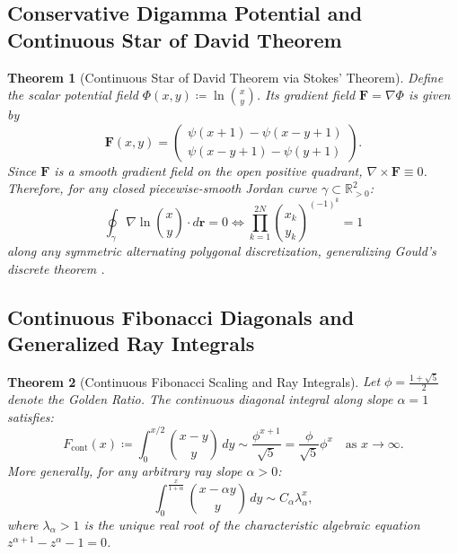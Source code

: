\documentclass[11pt,a4paper]{article}
\theoremstyle{plain}
\newtheorem{theorem}{Theorem}[section]
\theoremstyle{definition}
\theoremstyle{remark}
\numberwithin{equation}{section}
\begin{document}
\subsection{Conservative Digamma Potential and Continuous Star of David Theorem}

\begin{theorem}[Continuous Star of David Theorem via Stokes' Theorem]
Define the scalar potential field $\Phi(x, y) \coloneqq \ln \binom{x}{y}$. Its gradient field $\mathbf{F} = \nabla \Phi$ is given by
\begin{equation}
\mathbf{F}(x, y) = \begin{pmatrix} \psi(x+1) - \psi(x-y+1) \\ \psi(x-y+1) - \psi(y+1) \end{pmatrix}.
\end{equation}
Since $\mathbf{F}$ is a smooth gradient field on the open positive quadrant, $\nabla \times \mathbf{F} \equiv 0$. Therefore, for any closed piecewise-smooth Jordan curve $\gamma \subset \mathbb{R}_{>0}^2$:
\begin{equation}
\oint_\gamma \nabla \ln \binom{x}{y} \cdot d\mathbf{r} = 0 \iff \prod_{k=1}^{2N} \binom{x_k}{y_k}^{(-1)^k} = 1
\end{equation}
along any symmetric alternating polygonal discretization, generalizing Gould's discrete theorem \cite{gould1972}.
\end{theorem}

\subsection{Continuous Fibonacci Diagonals and Generalized Ray Integrals}

\begin{theorem}[Continuous Fibonacci Scaling and Ray Integrals]
Let $\phi = \frac{1+\sqrt{5}}{2}$ denote the Golden Ratio. The continuous diagonal integral along slope $\alpha = 1$ satisfies:
\begin{equation}
F_{\text{cont}}(x) \coloneqq \int_0^{x/2} \binom{x-y}{y}\,dy \sim \frac{\phi^{x+1}}{\sqrt{5}} = \frac{\phi}{\sqrt{5}}\phi^x \quad \text{as } x \to \infty.
\end{equation}
More generally, for any arbitrary ray slope $\alpha > 0$:
\begin{equation}
\int_0^{\frac{x}{1+\alpha}} \binom{x-\alpha y}{y}\,dy \sim C_\alpha \lambda_\alpha^x,
\end{equation}
where $\lambda_\alpha > 1$ is the unique real root of the characteristic algebraic equation $z^{\alpha+1} - z^\alpha - 1 = 0$.
\end{theorem}
\end{document}
